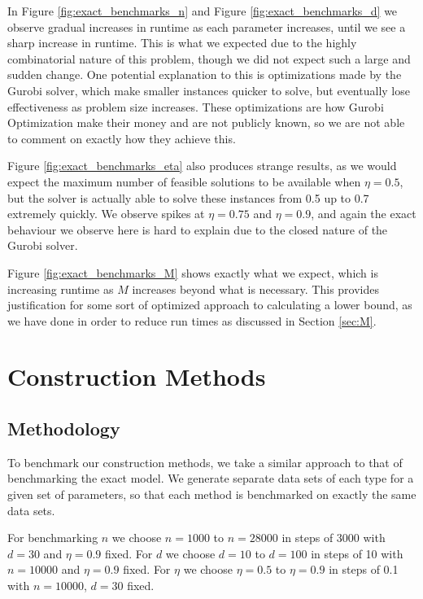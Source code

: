 \documentclass[11pt,twoside]{report}
\theoremstyle{definition}
\numberwithin{theorem}{section}
\numberwithin{definition}{section}
\numberwithin{lemma}{section}
\numberwithin{proposition}{section}
\numberwithin{equation}{section}
\numberwithin{figure}{section}
\begin{document}
In Figure \ref{fig:exact_benchmarks_n} and Figure \ref{fig:exact_benchmarks_d} we observe gradual increases in runtime as each parameter increases, until we see a sharp increase in runtime. This is what we expected due to the highly combinatorial nature of this problem, though we did not expect such a large and sudden change. One potential explanation to this is optimizations made by the Gurobi solver, which make smaller instances quicker to solve, but eventually lose effectiveness as problem size increases. These optimizations are how Gurobi Optimization make their money and are not publicly known, so we are not able to comment on exactly how they achieve this.

Figure \ref{fig:exact_benchmarks_eta} also produces strange results, as we would expect the maximum number of feasible solutions to be available when $\eta=0.5$, but the solver is actually able to solve these instances from 0.5 up to 0.7 extremely quickly. We observe spikes at $\eta=0.75$ and $\eta=0.9$, and again the exact behaviour we observe here is hard to explain due to the closed nature of the Gurobi solver.

Figure \ref{fig:exact_benchmarks_M} shows exactly what we expect, which is increasing runtime as $M$ increases beyond what is necessary. This provides justification for some sort of optimized approach to calculating a lower bound, as we have done in order to reduce run times as discussed in Section \ref{sec:M}.


\section{Construction Methods}\label{sec:benchmark_constr}
\subsection{Methodology}
To benchmark our construction methods, we take a similar approach to that of benchmarking the exact model. We generate separate data sets of each type for a given set of parameters, so that each method is benchmarked on exactly the same data sets.

For benchmarking $n$ we choose $n=1000$ to $n=28000$ in steps of 3000 with $d=30$ and $\eta=0.9$ fixed. For $d$ we choose $d=10$ to $d=100$ in steps of 10 with $n=10000$ and $\eta=0.9$ fixed. For $\eta$ we choose $\eta=0.5$ to $\eta=0.9$ in steps of 0.1 with $n=10000$, $d=30$ fixed.
\end{document}
